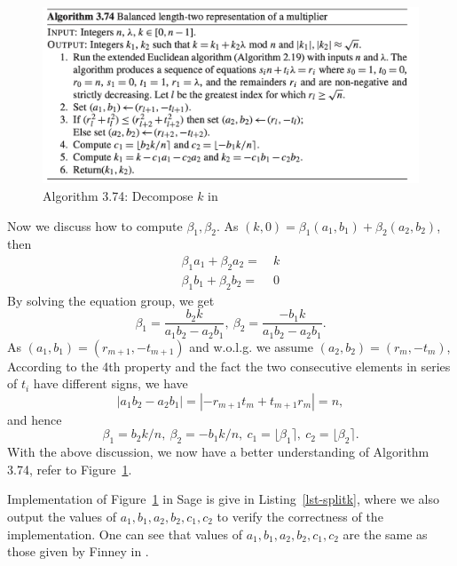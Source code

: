 \documentclass{article}
\begin{document}
\begin{figure}[h]
\centering
\caption{Algorithm 3.74: Decompose $k$ in \cite{guidetoecc}~}\label{fig-splitk}
\includegraphics[width=\textwidth]{split-k.png}
\end{figure}

Now we discuss how to compute $\beta_1, \beta_2$. As $(k, 0) = \beta_1(a_1,b_1) + \beta_2(a_2, b_2)$, then
\begin{equation}\nonumber
\begin{split}
\beta_1a_1 + \beta_2a_2 =& \  k\\
\beta_1b_1 + \beta_2b_2 =& \ 0
\end{split}
\end{equation}
By solving the equation group, we get
$$
\beta_1 = \dfrac{b_2k}{a_1b_2 - a_2b_1}, \ \beta_2 = \dfrac{-b_1k}{a_1b_2-a_2b_1}.
$$
As $(a_1, b_1) = (r_{m+1}, - t_{m+1})$ and  w.o.l.g. we assume $(a_2, b_2) = (r_{m}, - t_{m})$, 
According to the 4th property and the fact the two consecutive elements in series of $t_i$ have different signs, we have
$$|a_1b_2-a_2b_1| = |-r_{m+1}t_{m}+ t_{m+1}r_{m}| = n,$$
and hence
$$\beta_1 = b_2k / n, \ \beta_2 = -b_1k/n, \ c_1 = \lfloor \beta_1 \rceil, \  c_2 = \lfloor \beta_2 \rceil.$$
With the above discussion, we now have a better understanding of Algorithm 3.74, refer to Figure~\ref{fig-splitk}.

Implementation of Figure~\ref{fig-splitk} in Sage is give in Listing~\ref{lst-splitk}, where we also output the values of 
$a_1, b_1, a_2, b_2, c_1, c_2$ to verify the correctness of the implementation.
One can see that values of $a_1, b_1, a_2, b_2, c_1, c_2$ are the same as those given by Finney in \cite{halfinney}.


\end{document}

